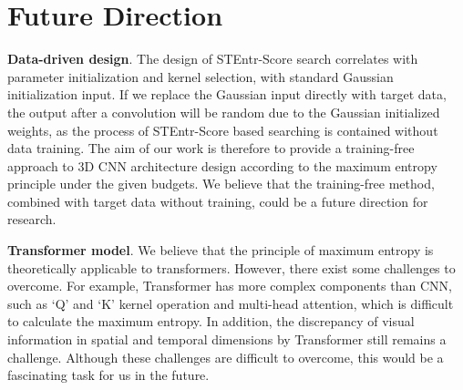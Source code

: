 \documentclass{article} \usepackage{iclr2023_conference,times}
\begin{document}
\begin{table}[ht]
    \caption{Inference comparison using a Tesla V100 on the Sth-Sth V1 dataset.}
    \centering
    \setlength\tabcolsep{3pt}
    
    \label{tab:time}
\end{table}

















\section{Future Direction}
\label{sec:future}



\noindent\textbf{Data-driven design}.
The design of STEntr-Score search correlates with parameter initialization and kernel selection, with standard Gaussian initialization input.
If we replace the Gaussian input directly with target data, the output after a convolution will be random due to the Gaussian initialized weights, as the process of STEntr-Score based searching is contained without data training. 
The aim of our work is therefore to provide a training-free approach to 3D CNN architecture design according to the maximum entropy principle under the given budgets. We believe that the training-free method, combined with target data without training, could be a future direction for research.

\noindent\textbf{Transformer model}.
We believe that the principle of maximum entropy is theoretically applicable to transformers. However, there exist some challenges to overcome. For example, Transformer has more complex components than CNN, such as `Q' and `K' kernel operation and multi-head attention, which is difficult to calculate the maximum entropy. In addition, the discrepancy of visual information in spatial and temporal dimensions by Transformer still remains a challenge. Although these challenges are difficult to overcome, this would be a fascinating task for us in the future.
\end{document}
